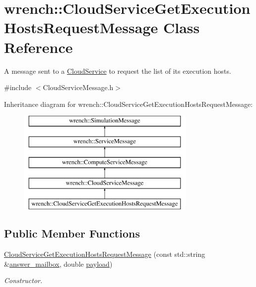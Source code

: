 \hypertarget{classwrench_1_1_cloud_service_get_execution_hosts_request_message}{}\section{wrench\+:\+:Cloud\+Service\+Get\+Execution\+Hosts\+Request\+Message Class Reference}
\label{classwrench_1_1_cloud_service_get_execution_hosts_request_message}


A message sent to a \hyperlink{classwrench_1_1_cloud_service}{Cloud\+Service} to request the list of its execution hosts.  




{\ttfamily \#include $<$Cloud\+Service\+Message.\+h$>$}

Inheritance diagram for wrench\+:\+:Cloud\+Service\+Get\+Execution\+Hosts\+Request\+Message\+:\begin{figure}[H]
\begin{center}
\leavevmode
\includegraphics[height=5.000000cm]{classwrench_1_1_cloud_service_get_execution_hosts_request_message}
\end{center}
\end{figure}
\subsection*{Public Member Functions}
\begin{DoxyCompactItemize}
\item 
\hyperlink{classwrench_1_1_cloud_service_get_execution_hosts_request_message_a43a48eb6d951afe6cd655088a9a8fe8e}{Cloud\+Service\+Get\+Execution\+Hosts\+Request\+Message} (const std\+::string \&\hyperlink{classwrench_1_1_cloud_service_get_execution_hosts_request_message_a9d09cfc3866e41d291cd05280d820376}{answer\+\_\+mailbox}, double \hyperlink{classwrench_1_1_simulation_message_a914f2732713f7c02898e66f05a7cb8a1}{payload})
\begin{DoxyCompactList}\small\item\em Constructor. \end{DoxyCompactList}\end{DoxyCompactItemize}
